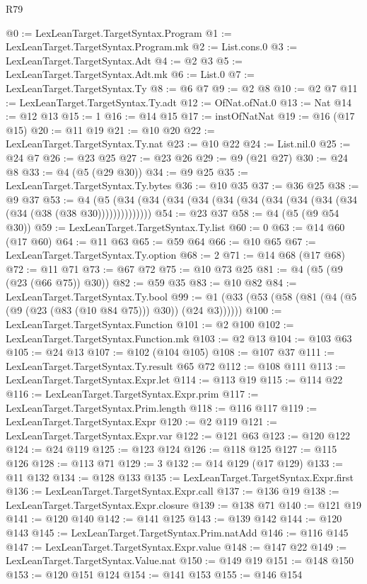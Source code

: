 \begin{lexlean}{R79}
\begin{coremodule}
@0 := LexLeanTarget.TargetSyntax.Program
@1 := LexLeanTarget.TargetSyntax.Program.mk
@2 := List.cons.{0}
@3 := LexLeanTarget.TargetSyntax.Adt
@4 := @2 @3
@5 := LexLeanTarget.TargetSyntax.Adt.mk
@6 := List.{0}
@7 := LexLeanTarget.TargetSyntax.Ty
@8 := @6 @7
@9 := @2 @8
@10 := @2 @7
@11 := LexLeanTarget.TargetSyntax.Ty.adt
@12 := OfNat.ofNat.{0}
@13 := Nat
@14 := @12 @13
@15 := 1
@16 := @14 @15
@17 := instOfNatNat
@19 := @16 (@17 @15)
@20 := @11 @19
@21 := @10 @20
@22 := LexLeanTarget.TargetSyntax.Ty.nat
@23 := @10 @22
@24 := List.nil.{0}
@25 := @24 @7
@26 := @23 @25
@27 := @23 @26
@29 := @9 (@21 @27)
@30 := @24 @8
@33 := @4 (@5 (@29 @30))
@34 := @9 @25
@35 := LexLeanTarget.TargetSyntax.Ty.bytes
@36 := @10 @35
@37 := @36 @25
@38 := @9 @37
@53 := @4 (@5 (@34 (@34 (@34 (@34 (@34 (@34 (@34 (@34 (@34 (@34 (@34 (@38 (@38 @30))))))))))))))
@54 := @23 @37
@58 := @4 (@5 (@9 @54 @30))
@59 := LexLeanTarget.TargetSyntax.Ty.list
@60 := 0
@63 := @14 @60 (@17 @60)
@64 := @11 @63
@65 := @59 @64
@66 := @10 @65
@67 := LexLeanTarget.TargetSyntax.Ty.option
@68 := 2
@71 := @14 @68 (@17 @68)
@72 := @11 @71
@73 := @67 @72
@75 := @10 @73 @25
@81 := @4 (@5 (@9 (@23 (@66 @75)) @30))
@82 := @59 @35
@83 := @10 @82
@84 := LexLeanTarget.TargetSyntax.Ty.bool
@99 := @1 (@33 (@53 (@58 (@81 (@4 (@5 (@9 (@23 (@83 (@10 @84 @75))) @30)) (@24 @3))))))
@100 := LexLeanTarget.TargetSyntax.Function
@101 := @2 @100
@102 := LexLeanTarget.TargetSyntax.Function.mk
@103 := @2 @13
@104 := @103 @63
@105 := @24 @13
@107 := @102 (@104 @105)
@108 := @107 @37
@111 := LexLeanTarget.TargetSyntax.Ty.result @65 @72
@112 := @108 @111
@113 := LexLeanTarget.TargetSyntax.Expr.let
@114 := @113 @19
@115 := @114 @22
@116 := LexLeanTarget.TargetSyntax.Expr.prim
@117 := LexLeanTarget.TargetSyntax.Prim.length
@118 := @116 @117
@119 := LexLeanTarget.TargetSyntax.Expr
@120 := @2 @119
@121 := LexLeanTarget.TargetSyntax.Expr.var
@122 := @121 @63
@123 := @120 @122
@124 := @24 @119
@125 := @123 @124
@126 := @118 @125
@127 := @115 @126
@128 := @113 @71
@129 := 3
@132 := @14 @129 (@17 @129)
@133 := @11 @132
@134 := @128 @133
@135 := LexLeanTarget.TargetSyntax.Expr.first
@136 := LexLeanTarget.TargetSyntax.Expr.call
@137 := @136 @19
@138 := LexLeanTarget.TargetSyntax.Expr.closure
@139 := @138 @71
@140 := @121 @19
@141 := @120 @140
@142 := @141 @125
@143 := @139 @142
@144 := @120 @143
@145 := LexLeanTarget.TargetSyntax.Prim.natAdd
@146 := @116 @145
@147 := LexLeanTarget.TargetSyntax.Expr.value
@148 := @147 @22
@149 := LexLeanTarget.TargetSyntax.Value.nat
@150 := @149 @19
@151 := @148 @150
@153 := @120 @151 @124
@154 := @141 @153
@155 := @146 @154

\end{coremodule}
\end{lexlean}
